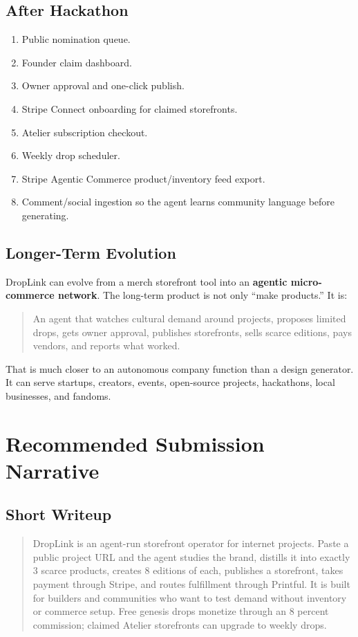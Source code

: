 \documentclass[11pt]{article}
\begin{document}
\subsection{After Hackathon}

\begin{enumerate}
  \item Public nomination queue.
  \item Founder claim dashboard.
  \item Owner approval and one-click publish.
  \item Stripe Connect onboarding for claimed storefronts.
  \item Atelier subscription checkout.
  \item Weekly drop scheduler.
  \item Stripe Agentic Commerce product/inventory feed export.
  \item Comment/social ingestion so the agent learns community language before generating.
\end{enumerate}

\subsection{Longer-Term Evolution}

DropLink can evolve from a merch storefront tool into an \textbf{agentic micro-commerce network}. The long-term product is not only ``make products.'' It is:

\begin{quote}
  An agent that watches cultural demand around projects, proposes limited drops, gets owner approval, publishes storefronts, sells scarce editions, pays vendors, and reports what worked.
\end{quote}

That is much closer to an autonomous company function than a design generator. It can serve startups, creators, events, open-source projects, hackathons, local businesses, and fandoms.

\section{Recommended Submission Narrative}

\subsection{Short Writeup}

\begin{quote}
  DropLink is an agent-run storefront operator for internet projects. Paste a public project URL and the agent studies the brand, distills it into exactly 3 scarce products, creates 8 editions of each, publishes a storefront, takes payment through Stripe, and routes fulfillment through Printful. It is built for builders and communities who want to test demand without inventory or commerce setup. Free genesis drops monetize through an 8 percent commission; claimed Atelier storefronts can upgrade to weekly drops.
\end{quote}
\end{document}
